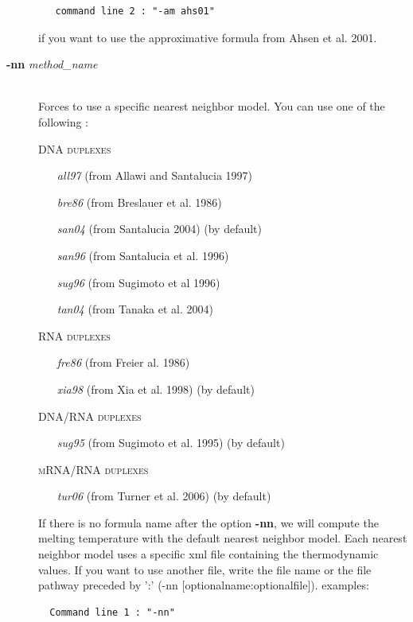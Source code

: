\documentclass{article}
\begin{document}
\begin{description}
  \begin{verbatim}
   command line 2 : "-am ahs01" 
  \end{verbatim}
  	  
  if you want to use the approximative formula from 
  Ahsen et al. 2001.
    	
\item [\textbf{-nn} \textit{method\_name}]\mbox{}\\ 
  Forces to use a specific nearest neighbor model. You can use one of the following :
  
  \textsc{DNA duplexes}
    \begin{itemize}
    \item [\textit{all97}] (from Allawi and Santalucia 1997)
    \item [\textit{bre86}] (from Breslauer et al. 1986)
    \item [\textit{san04}] (from Santalucia 2004)  (by default)
    \item [\textit{san96}] (from Santalucia et al. 1996)
    \item [\textit{sug96}] (from Sugimoto et al 1996)
    \item [\textit{tan04}] (from Tanaka et al. 2004)		 
    \end{itemize}
  \textsc{RNA duplexes}
    \begin{itemize}
    \item [\textit{fre86}] (from Freier al. 1986)
    \item [\textit{xia98}] (from Xia et al. 1998)  (by default)		 
    \end{itemize}
  \textsc{DNA/RNA duplexes}
    \begin{itemize}
    \item [\textit{sug95}] (from Sugimoto et al. 1995)  (by default)
    \end{itemize}
  \textsc{mRNA/RNA duplexes}
    \begin{itemize}
    \item [\textit{tur06}] (from Turner et al. 2006)  (by default)
    \end{itemize}
  If there is no formula name after the option \textbf{-nn}, we will compute the melting temperature with the default nearest neighbor model. 
  Each nearest neighbor model uses a specific xml file containing the thermodynamic values. If you want to use another file, write the file name or the file pathway preceded by ':' (-nn [optionalname:optionalfile]).
  examples:
     
  \begin{verbatim}
  Command line 1 : "-nn" 
  

\end{verbatim}
\end{description}
\end{document}
